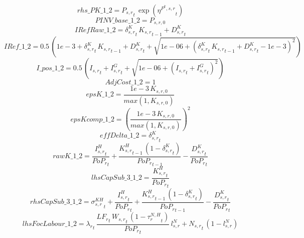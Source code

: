 \begin{dmath*}
rhs\_PK\_1\_2 = {{P_{s,r}}}_{t}\, \exp\left({{\eta^{P^k,s,r}}}_{t}\right)
\end{dmath*}
\begin{dmath*}
PINV\_base\_1\_2 = {{P_{s,r,0}}}
\end{dmath*}
\begin{dmath*}
IRefRaw\_1\_2 = {{\delta^{K}_{s,r}}}_{t}\, {{K_{s,r}}}_{t-1}+{{D^K_{s,r}}}_{t}
\end{dmath*}
\begin{dmath*}
IRef\_1\_2 = 0.5\, \left(1e-3+{{\delta^{K}_{s,r}}}_{t}\, {{K_{s,r}}}_{t-1}+{{D^K_{s,r}}}_{t}+\sqrt{1e-06+\left({{\delta^{K}_{s,r}}}_{t}\, {{K_{s,r}}}_{t-1}+{{D^K_{s,r}}}_{t}-1e-3\right)^{2}}\right)
\end{dmath*}
\begin{dmath*}
I\_pos\_1\_2 = 0.5\, \left({{I_{s,r}}}_{t}+{{I^G_{s,r}}}_{t}+\sqrt{1e-06+\left({{I_{s,r}}}_{t}+{{I^G_{s,r}}}_{t}\right)^{2}}\right)
\end{dmath*}
\begin{dmath*}
AdjCost\_1\_2 = 1
\end{dmath*}
\begin{dmath*}
epsK\_1\_2 = \frac{1e-3\, {{K_{s,r,0}}}}{max(1,{{K_{s,r,0}}})}
\end{dmath*}
\begin{dmath*}
epsKcomp\_1\_2 = \left(\frac{1e-3\, {{K_{s,r,0}}}}{max(1,{{K_{s,r,0}}})}\right)^{2}
\end{dmath*}
\begin{dmath*}
effDelta\_1\_2 = {{\delta^{K}_{s,r}}}_{t}
\end{dmath*}
\begin{dmath*}
rawK\_1\_2 = \frac{{{I^H_{s,r}}}_{t}}{{{PoP_r}}_{t}}+\frac{{{K^H_{s,r}}}_{t-1}\, \left(1-{{\delta^{K}_{s,r}}}_{t}\right)}{{{PoP_r}}_{t-1}}-\frac{{{D^K_{s,r}}}_{t}}{{{PoP_r}}_{t}}
\end{dmath*}
\begin{dmath*}
lhsCapSub\_3\_1\_2 = \frac{{{K^H_{s,r}}}_{t}}{{{PoP_r}}_{t}}
\end{dmath*}
\begin{dmath*}
rhsCapSub\_3\_1\_2 = {{\sigma^{KH}_{s,r}}}_{t}+\frac{{{I^H_{s,r}}}_{t}}{{{PoP_r}}_{t}}+\frac{{{K^H_{s,r}}}_{t-1}\, \left(1-{{\delta^{K}_{s,r}}}_{t}\right)}{{{PoP_r}}_{t-1}}-\frac{{{D^K_{s,r}}}_{t}}{{{PoP_r}}_{t}}
\end{dmath*}
\begin{dmath*}
lhsFocLabour\_1\_2 = {\lambda_r}_{t}\, \frac{{{LF_r}}_{t}\, {{W_{s,r}}}_{t}\, \left(1-{{\tau^{N,H}_{r}}}_{t}\right)}{{{PoP_r}}_{t}}\, {{l^{N}_{s,r}}}+{{N_{s,r}}}_{t}\, \left(1-{{l^{N}_{s,r}}}\right)
\end{dmath*}
